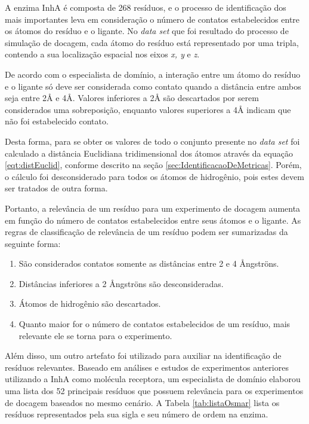 A enzima InhA é composta de 268 resíduos, e o processo de identificação dos mais importantes leva em consideração o número de contatos estabelecidos entre os átomos do resíduo e o ligante. No \emph{data set} que foi resultado do processo de simulação de docagem, cada átomo do resíduo está representado por uma tripla, contendo a sua localização espacial nos eixos \emph{x, y }e \emph{z}.

De acordo com o especialista de domínio, a interação entre um átomo do resíduo e o ligante só deve ser considerada como contato quando a distância entre ambos seja entre 2{\AA} e 4{\AA}. Valores inferiores a 2{\AA} são descartados por serem considerados uma sobreposição, enquanto valores superiores a 4{\AA} indicam que não foi estabelecido contato. 

Desta forma, para se obter os valores de todo o conjunto presente no \emph{data set} foi calculado a distância Euclidiana tridimensional dos átomos através da equação \ref{eqt:distEuclid}, conforme descrito na seção \ref{sec:IdentificacaoDeMetricas}. Porém, o cálculo foi desconsiderado para todos os átomos de hidrogênio, pois estes devem ser tratados de outra forma.

Portanto, a relevância de um resíduo para um experimento de docagem aumenta em função do número de contatos estabelecidos entre seus átomos e o ligante. As regras de classificação de relevância de um resíduo podem ser sumarizadas da seguinte forma:

\begin{enumerate}
	\item São considerados contatos somente as distâncias entre 2 e 4 {\AA}ngstr\"ons.
	\item Distâncias inferiores a 2 {\AA}ngstr\"ons são desconsideradas.
	\item Átomos de hidrogênio são descartados.
	\item Quanto maior for o número de contatos estabelecidos de um resíduo, mais relevante ele se torna para o experimento.
\end{enumerate}

Além disso, um outro artefato foi utilizado para auxiliar na identificação de resíduos relevantes. Baseado em análises e estudos de experimentos anteriores utilizando a InhA como molécula receptora, um especialista de domínio elaborou uma lista dos 52 principais resíduos que possuem relevância para os experimentos de docagem baseados no mesmo cenário. A Tabela \ref{tab:listaOsmar} lista os resíduos representados pela sua sigla e seu número de ordem na enzima.

